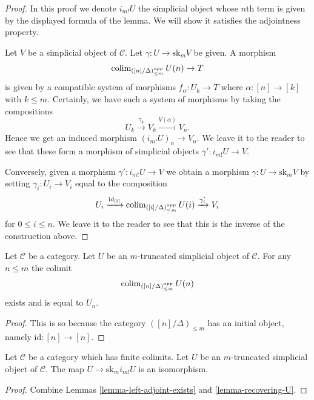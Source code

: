 \begin{proof}
In this proof we denote $i_{m!}U$ the simplicial object
whose $n$th term is given by the displayed formula of the
lemma. We will show it satisfies the adjointness property.

\medskip\noindent
Let $V$ be a simplicial object of $\mathcal{C}$.
Let $\gamma : U \to \text{sk}_mV$ be given.
A morphism
$$
\mathop{\mathrm{colim}}\nolimits_{([n]/\Delta)_{\leq m}^{opp}} U(n) \to T
$$
is given by a compatible system of morphisms
$f_\alpha : U_k \to T$ where $\alpha : [n] \to [k]$
with $k \leq m$. Certainly, we have such a system of
morphisms by taking the compositions
$$
U_k \xrightarrow{\gamma_k} V_k \xrightarrow{V(\alpha)} V_n.
$$
Hence we get an induced morphism $(i_{m!}U)_n \to V_n$.
We leave it to the reader to see that these form a
morphism of simplicial objects $\gamma' : i_{m!}U \to V$.

\medskip\noindent
Conversely, given a morphism $\gamma' : i_{m!}U \to V$ we obtain
a morphism $\gamma : U \to \text{sk}_m V$ by setting
$\gamma_i : U_i \to V_i$ equal to the composition
$$
U_i
\xrightarrow{\text{id}_{[i]}}
\mathop{\mathrm{colim}}\nolimits_{([i]/\Delta)_{\leq m}^{opp}} U(i)
\xrightarrow{\gamma'_i}
V_i
$$
for $0 \leq i \leq n$. We leave it to the reader to see that
this is the inverse of the construction above.
\end{proof}

\begin{lemma}
\label{lemma-recovering-U}
Let $\mathcal{C}$ be a category.
Let $U$ be an $m$-truncated simplicial object of $\mathcal{C}$.
For any $n \leq m$ the colimit
$$
\mathop{\mathrm{colim}}\nolimits_{([n]/\Delta)_{\leq m}^{opp}} U(n)
$$
exists and is equal to $U_n$.
\end{lemma}

\begin{proof}
This is so because the category $([n]/\Delta)_{\leq m}$
has an initial object, namely $\text{id} : [n] \to [n]$.
\end{proof}

\begin{lemma}
\label{lemma-recovering-U-for-real}
Let $\mathcal{C}$ be a category which has finite colimits.
Let $U$ be an $m$-truncated simplicial object of $\mathcal{C}$.
The map $U \to \text{sk}_m i_{m!}U$ is an isomorphism.
\end{lemma}

\begin{proof}
Combine Lemmas \ref{lemma-left-adjoint-exists} and \ref{lemma-recovering-U}.
\end{proof}

